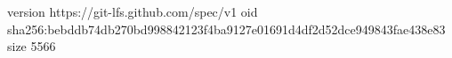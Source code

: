 version https://git-lfs.github.com/spec/v1
oid sha256:bebddb74db270bd998842123f4ba9127e01691d4df2d52dce949843fae438e83
size 5566
